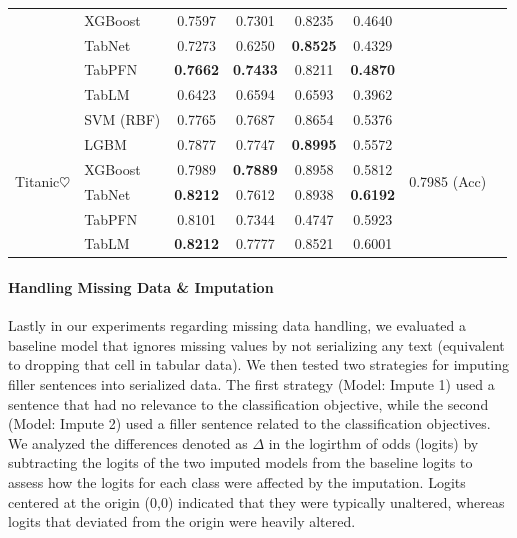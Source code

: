 \documentclass{article}
\newcommand{\cmark}{\ding{51}}%
\theoremstyle{plain}
\theoremstyle{definition}
\theoremstyle{remark}
\begin{document}
\begin{table}[h!]
\begin{center}
\begin{small}
\begin{sc}
\begin{adjustbox}{width=\textwidth}
\begin{tabular}{p{2cm}p{2.8cm}|cccc|c|c}
& XGBoost&0.7597&0.7301&0.8235&0.4640&\\ 
& TabNet&0.7273&0.6250&\textbf{0.8525}&0.4329&\\
& TabPFN&\textbf{0.7662}&\textbf{0.7433}&0.8211&\textbf{0.4870}&\\ 
& TabLM &0.6423&0.6594&0.6593&0.3962&\\ 
\hline
\multirow{6}{*}{Titanic$\heartsuit$} & SVM (RBF)&0.7765&0.7687&0.8654&0.5376&\multirow{6}{*}{0.7985 (Acc) \cite{sarkar2022xbnet}}&\multirow{6}{*}{\cmark}\\ 
& LGBM&0.7877&0.7747&\textbf{0.8995}&0.5572&\\ 
& XGBoost&0.7989&\textbf{0.7889}&0.8958&0.5812&\\ 
& TabNet&\textbf{0.8212}&0.7612&0.8938&\textbf{0.6192}&\\
& TabPFN&0.8101&0.7344&0.4747&0.5923&\\ 
& TabLM &\textbf{0.8212}& 0.7777&0.8521&0.6001&\\ 
\bottomrule
\end{tabular}
\end{adjustbox}
\end{sc}
\end{small}
\end{center}
\vskip -0.1in
\end{table}

\paragraph{Handling Missing Data \& Imputation} Lastly in our experiments regarding missing data handling, we evaluated a baseline model that ignores missing values by not serializing any text (equivalent to dropping that cell in tabular data). We then tested two strategies for imputing filler sentences into serialized data. The first strategy (Model: Impute 1) used a sentence that had no relevance to the classification objective, while the second (Model: Impute 2) used a filler sentence related to the classification objectives. We analyzed the differences denoted as $\Delta$ in the logirthm of odds (logits) by subtracting the logits of the two imputed models from the baseline logits to assess how the logits for each class were affected by the imputation. Logits centered at the origin (0,0) indicated that they were typically unaltered, whereas logits that deviated from the origin were heavily altered.
\end{document}
